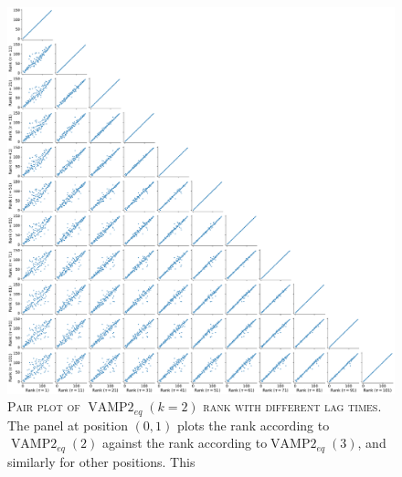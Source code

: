 \documentclass{article}
\begin{document}
\begin{figure}
    \centering
    \includegraphics[width=1.0\textwidth]{figures/vampeq_rank_vs_lag_pairplot_k2.pdf}
    \caption{\textsc{Pair plot of $\operatorname{VAMP2}_{eq}(k=2)$ rank with different lag times.} The panel at position $(0,1)$ plots the rank according to$\operatorname{VAMP2}_{eq}(2)$ against the  rank according to$\operatorname{VAMP2}_{eq}(3)$, and similarly for other positions. This }
    \label{fig:vampeq2_rank_vs_lag_pairplot}
\end{figure}
\end{document}
